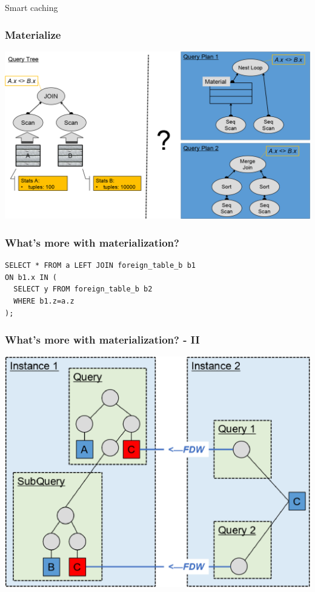\documentclass{beamer}
\begin{document}
\begin{frame}
\vspace*{\fill}\begin{center}
Smart caching
\end{center}\vspace*{\fill}
\end{frame}

\begin{frame}\frametitle{Materialize}
	\includegraphics[scale=0.35]{pics/material.png}
\end{frame}

\begin{frame}[fragile]\frametitle{What's more with materialization?}
\begin{lstlisting}
SELECT * FROM a LEFT JOIN foreign_table_b b1
ON b1.x IN (
  SELECT y FROM foreign_table_b b2
  WHERE b1.z=a.z
);
\end{lstlisting}
\end{frame}

\begin{frame}\frametitle{What's more with materialization? - II}
	\includegraphics[scale=0.47]{pics/material_show_problem}
\end{frame}
\end{document}
